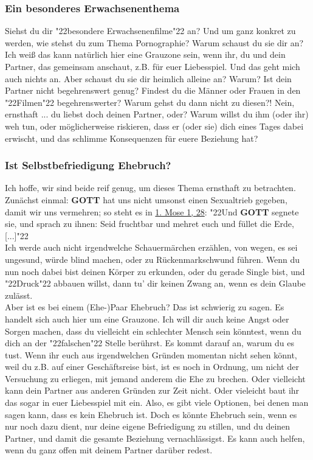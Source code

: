 \documentclass[12pt,a5paper]{article}
\newcommand{\Gott}[0]{\textbf{GOTT}}
\newcommand{\q}[1]{\char"22{#1}\char"22 }
\begin{document}
	\subsubsection{Ein besonderes Erwachsenenthema}
		Siehst du dir \q{besondere Erwachsenenfilme} an?
		Und um ganz konkret zu werden,
		wie stehst du zum Thema Pornographie?
		Warum schaust du sie dir an?
		Ich wei{\ss}
		das kann nat\"urlich hier eine Grauzone sein,
		wenn ihr,
		du und dein Partner,
		das gemeinsam anschaut,
		z.B. f\"ur euer Liebesspiel.
		Und das geht mich auch nichts an.
		Aber schaust du sie dir heimlich alleine an?
		Warum?
		Ist dein Partner nicht begehrenswert genug?
		Findest du die M\"anner oder Frauen in den \q{Filmen} begehrenswerter?
		Warum gehst du dann nicht zu diesen?!
		Nein,
		ernsthaft ...
		du liebst doch deinen Partner, oder?
		Warum willst du ihm (oder ihr) weh tun,
		oder m\"oglicherweise riskieren,
		dass er (oder sie) dich eines Tages dabei erwischt,
		und das schlimme Konsequenzen f\"ur euere Beziehung hat?
						
	\subsubsection{Ist Selbstbefriedigung Ehebruch?}
		Ich hoffe,
		wir sind beide reif genug,
		um dieses Thema ernsthaft zu betrachten.
		Zun\"achst einmal:
		{\Gott} hat uns nicht umsonst einen Sexualtrieb gegeben,
		damit wir uns vermehren;
		so steht es in \href{https://www.die-bibel.de/bibeln/online-bibeln/lesen/LU17/GEN.1/1.-Mose-1}{1. Mose 1, 28}:
		\q{Und {\Gott} segnete sie,
		und sprach zu ihnen:
		Seid fruchtbar und mehret euch und f\"ullet die Erde, [...]}
		\\
		Ich werde auch nicht irgendwelche Schauerm\"archen erz\"ahlen,
		von wegen,
		es sei ungesund,
		w\"urde blind machen,
		oder zu R\"uckenmarkschwund f\"uhren.
		Wenn du nun noch dabei bist deinen K\"orper zu erkunden,
		oder du gerade Single bist,
		und \q{Druck} abbauen willst,
		dann tu' dir keinen Zwang an,
		wenn es dein Glaube zul\"asst.
		\\
		Aber ist es bei einem (Ehe-)Paar Ehebruch?
		Das ist schwierig zu sagen.
		Es handelt sich auch hier um eine Grauzone.
		Ich will dir auch keine Angst oder Sorgen machen,
		dass du vielleicht ein schlechter Mensch sein k\"onntest,
		wenn du dich an der \q{falschen} Stelle ber\"uhrst.
		Es kommt darauf an,
		warum du es tust.
		Wenn ihr euch aus irgendwelchen Gr\"unden momentan nicht sehen k\"onnt,
		weil du z.B. auf einer Gesch\"aftsreise bist,
		ist es noch in Ordnung,
		um nicht der Versuchung zu erliegen,
		mit jemand anderem die Ehe zu brechen.
		Oder vielleicht kann dein Partner aus anderen Gr\"unden zur Zeit nicht.
		Oder vieleicht baut ihr das sogar in euer Liebesspiel mit ein.
		Also,
		es gibt viele Optionen,
		bei denen man sagen kann,
		dass es kein Ehebruch ist.
		Doch es k\"onnte Ehebruch sein,
		wenn es nur noch dazu dient,
		nur deine eigene Befriedigung zu stillen,
		und du deinen Partner,
		und damit die gesamte Beziehung vernachl\"assigst.
		Es kann auch helfen,
		wenn du ganz offen mit deinem Partner dar\"uber redest.
		
\end{document}
